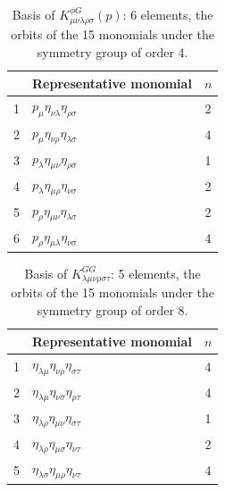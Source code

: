 \documentclass[prd,aps,preprint,superscriptaddress,nofootinbib,amsmath,amssymb,eqsecnum]{revtex4-2}
\begin{document}
\begin{table}[htb]
\centering
\begin{tabular}{@{}cl c@{}}
\toprule
& Representative monomial & $n$ \\
\midrule
1 & $p_{\mu}\eta_{\nu\lambda}\eta_{\rho\sigma}$ & 2 \\
2 & $p_{\mu}\eta_{\nu\rho}\eta_{\lambda\sigma}$ & 4 \\
3 & $p_{\lambda}\eta_{\mu\nu}\eta_{\rho\sigma}$ & 1 \\
4 & $p_{\lambda}\eta_{\mu\rho}\eta_{\nu\sigma}$ & 2 \\
5 & $p_{\rho}\eta_{\mu\nu}\eta_{\lambda\sigma}$ & 2 \\
6 & $p_{\rho}\eta_{\mu\lambda}\eta_{\nu\sigma}$ & 4 \\
\bottomrule
\end{tabular}
\caption{Basis of $K^{\phi G}_{\mu\nu\lambda\rho\sigma}(p)$: 6 elements, the orbits of the 15
monomials under the symmetry group of order 4.}
\label{tab:basis-phiG}
\end{table}

\begin{table}[htb]
\centering
\begin{tabular}{@{}cl c@{}}
\toprule
& Representative monomial & $n$ \\
\midrule
1 & $\eta_{\lambda\mu}\eta_{\nu\rho}\eta_{\sigma\tau}$ & 4 \\
2 & $\eta_{\lambda\mu}\eta_{\nu\sigma}\eta_{\rho\tau}$ & 4 \\
3 & $\eta_{\lambda\rho}\eta_{\mu\nu}\eta_{\sigma\tau}$ & 1 \\
4 & $\eta_{\lambda\rho}\eta_{\mu\sigma}\eta_{\nu\tau}$ & 2 \\
5 & $\eta_{\lambda\sigma}\eta_{\mu\rho}\eta_{\nu\tau}$ & 4 \\
\bottomrule
\end{tabular}
\caption{Basis of $K^{GG}_{\lambda\mu\nu\rho\sigma\tau}$: 5 elements, the orbits of the 15
monomials under the symmetry group of order 8.}
\label{tab:basis-GG}
\end{table}
\end{document}
